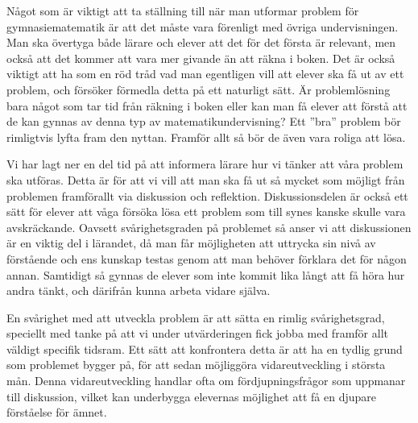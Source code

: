 \textcolor{Mahogany}{Något som är viktigt att ta ställning till när man utformar problem för gymnasiematematik är att det måste vara förenligt med övriga undervisningen. Man ska övertyga både lärare och elever att det för det första är relevant, men också att det kommer att vara mer givande än att räkna i boken. Det är också viktigt att ha som en röd tråd vad man egentligen vill att elever ska få ut av ett problem, och försöker förmedla detta på ett naturligt sätt. Är problemlösning bara något som tar tid från räkning i boken eller kan man få elever att förstå att de kan gynnas av denna typ av matematikundervisning? Ett ''bra'' problem bör rimligtvis lyfta fram den nyttan. Framför allt så bör de även vara roliga att lösa.}

\textcolor{Mahogany}{Vi har lagt ner en del tid på att informera lärare hur vi tänker att våra problem ska utföras. Detta är för att vi vill att man ska få ut så mycket som möjligt från problemen framförallt via diskussion och reflektion. Diskussionsdelen är också ett sätt för elever att våga försöka lösa ett problem som till synes kanske skulle vara avskräckande. Oavsett svårighetsgraden på problemet så anser vi att diskussionen är en viktig del i lärandet, då man får möjligheten att uttrycka sin nivå av förstående och ens kunskap testas genom att man behöver förklara det för någon annan. Samtidigt så gynnas de elever som inte kommit lika långt att få höra hur andra tänkt, och därifrån kunna arbeta vidare själva.}

\textcolor{Mahogany}{En svårighet med att utveckla problem är att sätta en rimlig svårighetsgrad, speciellt med tanke på att vi under utvärderingen fick jobba med framför allt väldigt specifik tidsram. Ett sätt att konfrontera detta är att ha en tydlig grund som problemet bygger på, för att sedan möjliggöra vidareutveckling i största mån. Denna vidareutveckling handlar ofta om fördjupningsfrågor som uppmanar till diskussion, vilket kan underbygga elevernas möjlighet att få en djupare förståelse för ämnet.}